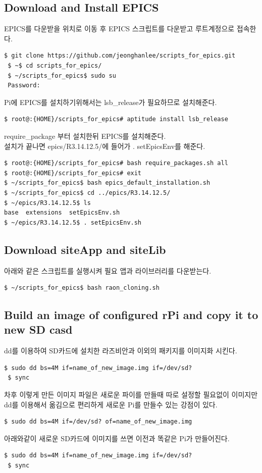 \documentclass[11pt
  , a4paper
  , article
  , oneside
]{memoir}
\begin{document}
\subsection{Download and Install EPICS}
EPICS를 다운받을 위치로 이동 후 EPICS 스크립트를 다운받고 루트계정으로 접속한다.
\begin{lstlisting}[style=termstyle]
 $ git clone https://github.com/jeonghanlee/scripts_for_epics.git
 $ ~$ cd scripts_for_epics/  
 $ ~/scripts_for_epics$ sudo su
 Password: 
\end{lstlisting}
Pi에 EPICS를 설치하기위해서는 lsb\_release가 필요하므로 설치해준다.
\begin{lstlisting}[style=termstyle]
$ root@:{HOME}/scripts_for_epics# aptitude install lsb_release
\end{lstlisting}
require\_package 부터 설치한뒤 EPICS를 설치해준다.\\
설치가 끝나면 epics/R3.14.12.5/에 들어가 . setEpicsEnv를 해준다.
\begin{lstlisting}[style=termstyle]
$ root@:{HOME}/scripts_for_epics# bash require_packages.sh all
$ root@:{HOME}/scripts_for_epics# exit
$ ~/scripts_for_epics$ bash epics_default_installation.sh 
$ ~/scripts_for_epics$ cd ../epics/R3.14.12.5/
$ ~/epics/R3.14.12.5$ ls
base  extensions  setEpicsEnv.sh
$ ~/epics/R3.14.12.5$ . setEpicsEnv.sh 
\end{lstlisting}
\subsection{Download siteApp and siteLib}
아래와 같은 스크립트를 실행시켜 필요 앱과 라이브러리를 다운받는다.
\begin{lstlisting}[style=termstyle]
 $ ~/scripts_for_epics$ bash raon_cloning.sh
\end{lstlisting}
\subsection{Build an image of configured rPi and copy it to new SD casd}
dd를 이용하여 SD카드에 설치한 라즈비안과 이외의 패키지를 이미지화 시킨다.
\begin{lstlisting}[style=termstyle]
 $ sudo dd bs=4M if=name_of_new_image.img if=/dev/sd?
 $ sync
\end{lstlisting}
차후 이렇게 만든 이미지 파일은 새로운 파이를 만들때 따로 설정할 필요없이 이미지만 dd를 이용해서 옮김으로 편리하게 새로운 Pi를 만들수 있는 강점이 있다.
\begin{lstlisting}[style=termstyle]
$ sudo dd bs=4M if=/dev/sd? of=name_of_new_image.img
\end{lstlisting}
아래와같이 새로운 SD카드에 이미지를 쓰면 이전과 똑같은 Pi가 만들어진다.
\begin{lstlisting}[style=termstyle]
 $ sudo dd bs=4M if=name_of_new_image.img if=/dev/sd?
 $ sync
\end{lstlisting}
\end{document}
